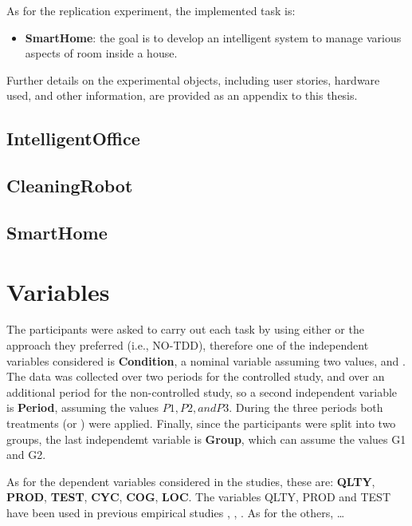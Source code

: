 As for the replication experiment, the implemented task is:
\begin{itemize}
    \item \textbf{SmartHome}: the goal is to develop an intelligent system to manage various aspects of room inside a house.
\end{itemize}

Further details on the experimental objects, including user stories, hardware used, and other information, are provided as an appendix to this thesis.


\subsection{IntelligentOffice}

\subsection{CleaningRobot}

\subsection{SmartHome}




\section{Variables}
The participants were asked to carry out each task by using either \tdd or the approach they preferred (i.e., NO-TDD), therefore one of the independent variables considered is \textbf{Condition}, a nominal variable assuming two values, \tdd and \notdd. The data was collected over two periods for the controlled study, and over an additional period for the non-controlled study, so a second independent variable is \textbf{Period}, assuming the values $P1, P2, and P3$. During the three periods both treatments (\tdd or \notdd) were applied. Finally, since the participants were split into two groups, the last independemt variable is \textbf{Group}, which can assume the values G1 and G2.


As for the dependent variables considered in the studies, these are: \textbf{QLTY}, \textbf{PROD}, \textbf{TEST}, \textbf{CYC}, \textbf{COG}, \textbf{LOC}.
The variables QLTY, PROD and TEST have been used in previous empirical studies \cite{DBLP:journals/tse/ErdogmusMT05}, \cite{DBLP:journals/tse/FucciETOJ17}, \cite{DBLP:journals/ese/TosunDFVTESOTJJ17}. As for the others, \dots


